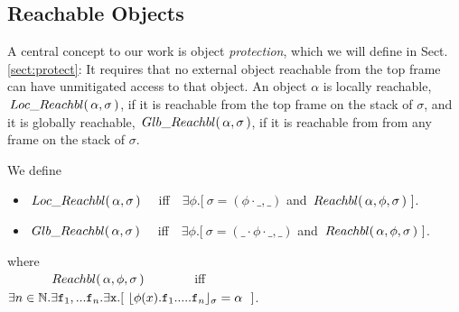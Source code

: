   \subsection{{Reachable  Objects}}

 {A central concept to our work is object \emph{protection}, which we will define in   Sect. \ref{sect:protect}: It requires that no external object  
reachable from the top frame  can have unmitigated access to that object.}
%
%
An object $\alpha$ is  locally reachable, $ \,Loc\_Reachbl(\,\alpha,\sigma\,) $, if it is reachable from the top frame on the stack of $\sigma$,
and it is globally reachable, $\,Glb\_Reachbl(\,\alpha,\sigma\,)$, if it is reachable from from any  frame on the stack of $\sigma$.
 
\begin{definition} We define 
\begin{itemize}
\item
$ \,Loc\_Reachbl(\,\alpha,\sigma\,) $ \ \ iff\ \  
$\exists \phi.[\ \sigma=(\phi\cdot\_, \_)$ and $\Relevant \alpha \phi \sigma\ ]$. %
\item
$\,Glb\_Reachbl(\,\alpha,\sigma\,)$  \ \ iff\ \  
$\exists \phi.[\ \sigma=(\_\cdot\phi\cdot\_, \_)$ and $\Relevant \alpha \phi \sigma\ ]$. %
\end{itemize}
where\\
$\strut\ \ \ \  \ \ \ \ \ \ \,Reachbl(\,\alpha,\phi,\sigma\,) $  \ \ \ \ \ \ \ iff\ \  
$\exists n\in \mathbb{N}.\exists \prg{f}_1,... \prg{f}_n.\exists \prg{x}.[ \ \interpret{\sigma}{\phi(x).\prg{f}_1.....\prg{f}_n} = \alpha \ \ ]$.

\end{definition}

